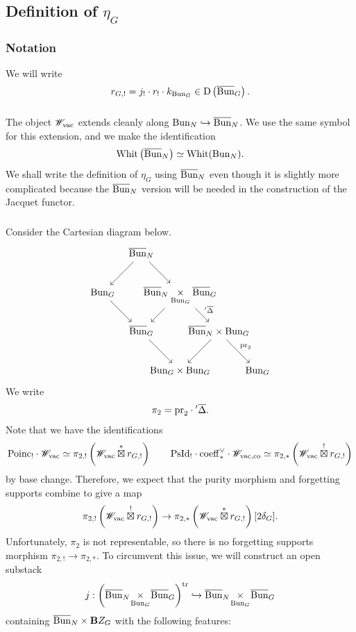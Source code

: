 \subsection{Definition of $\eta_G$}

\subsubsection{Notation} We will write
    \[r_{G,!} = j_! \cdot r_! \cdot k_{\mathrm{Bun}_G} \in \mathrm{D}\left( \overline{\mathrm{Bun}}_G \right).\]

\subsubsection{} The object $\mathscr{W}_{\mathrm{vac}}$ extends cleanly along $\mathrm{Bun}_N \hookrightarrow \overline{\mathrm{Bun}}_N$. We use the same symbol for this extension, and we make the identification
    \[\mathrm{Whit}\left(\overline{\mathrm{Bun}}_N\right) \simeq \mathrm{Whit}(\mathrm{Bun}_N).\]
We shall write the definition of $\eta_G$ using $\overline{\mathrm{Bun}}_N$ even though it is slightly more complicated because the $\overline{\mathrm{Bun}}_N$ version will be needed in the construction of the Jacquet functor.

\subsubsection{} Consider the Cartesian diagram below.
\[
\begin{tikzcd}[
  column sep={4em,between origins},
  row sep={4em,between origins}
]
    & \Bunc_N \arrow[dl] \arrow[dr] & & & \\    
  \Bun_G \arrow[dr] & & \Bunc_N \underset{\Bun_G}{\times} \Bunc_G \arrow[dl] \arrow[dr, "\aph\Deltac"] & & \\
    & \Bunc_G \arrow[dr] & & \Bunc_N \times \Bun_G \arrow[dl] \arrow[dr, "\pr_2"] & \\
    &  & \Bun_G \times \Bun_G & & \Bun_G
\end{tikzcd}
\]
We write
    \[\pi_2 = \mathrm{pr}_2 \cdot {'}\overline{\Delta}.\]
Note that we have the identifications
    \[
    \mathrm{Poinc}_! \cdot \mathscr{W}_{\mathrm{vac}} \simeq \pi_{2,!} \left( \mathscr{W}_{\mathrm{vac}} \overset{*}{\boxtimes} r_{G,!} \right)
    \qquad
    \mathrm{PsId}_! \cdot \mathrm{coeff}_*^\vee \cdot \mathscr{W}_{\mathrm{vac},\mathrm{co}} \simeq \pi_{2,*} \left( \mathscr{W}_{\mathrm{vac}} \overset{!}{\boxtimes} r_{G,!} \right)
    \]
by base change. Therefore, we expect that the purity morphism and forgetting supports combine to give a map
    \[
    \pi_{2,!} \left( \mathscr{W}_{\mathrm{vac}} \overset{!}{\boxtimes} r_{G,!} \right)
    \to \pi_{2,*} \left( \mathscr{W}_{\mathrm{vac}} \overset{*}{\boxtimes} r_{G,!} \right) [2 \delta_G].
    \]
Unfortunately, $\pi_2$ is not representable, so there is no forgetting supports morphism $\pi_{2,!} \to \pi_{2,*}$. To circumvent this issue, we will construct an open substack
\begin{equation}
\label{eqn:trans_open}
  j : \left( \overline{\mathrm{Bun}}_N \!\underset{\mathrm{Bun}_G}{\times}\! \overline{\mathrm{Bun}}_G \right)^{\mathrm{tr}} \hookrightarrow \overline{\mathrm{Bun}}_N \!\underset{\mathrm{Bun}_G}{\times}\! \overline{\mathrm{Bun}}_G
\end{equation}
containing $\overline{\mathrm{Bun}}_N \times \mathbf{B} Z_G$ with the following features:

